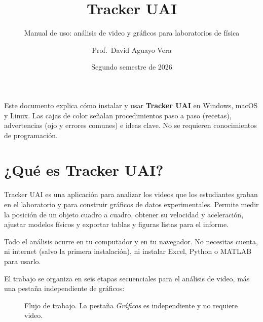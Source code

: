 \documentclass[11pt,a4paper]{article}
\title{Tracker UAI}
\subtitle{Manual de uso: análisis de video y gráficos para laboratorios de física}
\author{Prof.\ David Aguayo Vera}
\date{Segundo semestre de 2026}
\begin{document}

\maketitle

\begin{obs}
  Este documento explica cómo instalar y usar \textbf{Tracker UAI} en Windows,
  macOS y Linux. Las cajas de color señalan procedimientos paso a paso
  (\textcolor{uaiNaranja}{recetas}), advertencias (\textcolor{uaiRojo}{ojo} y
  errores comunes) e ideas clave. No se requieren conocimientos de programación.
\end{obs}

\tableofcontents
\vspace{4mm}

\section{¿Qué es Tracker UAI?}

Tracker UAI es una aplicación para analizar los videos que los estudiantes graban
en el laboratorio y para construir gráficos de datos experimentales. Permite medir
la posición de un objeto cuadro a cuadro, obtener su velocidad y aceleración,
ajustar modelos físicos y exportar tablas y figuras listas para el informe.

\begin{idea}
  Todo el análisis ocurre en tu computador y en tu navegador. No necesitas cuenta,
  ni internet (salvo la primera instalación), ni instalar Excel, Python o MATLAB
  para usarlo.
\end{idea}

El trabajo se organiza en seis etapas secuenciales para el análisis de video, más
una pestaña independiente de gráficos:

\begin{figure}[htbp]
  \centering
  \caption{Flujo de trabajo. La pestaña \emph{Gráficos} es independiente y no
           requiere video.}
  \label{fig:flujo}
\end{figure}
\end{document}
